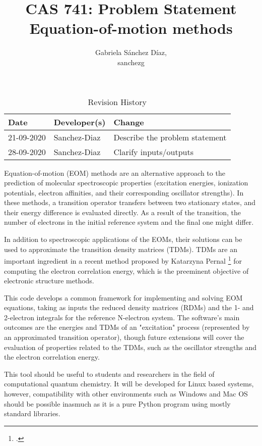\documentclass{article}
\title{CAS 741: Problem Statement\\Equation-of-motion methods}
\author{Gabriela S\'anchez D\'iaz,\\ sanchezg}
\date{}
\begin{document}
\maketitle

\begin{table}[hp]
\caption{Revision History} \label{TblRevisionHistory}
\begin{tabularx}{\textwidth}{llX}
\toprule
\textbf{Date} & \textbf{Developer(s)} & \textbf{Change}\\
\midrule
21-09-2020 & Sanchez-Diaz & Describe the problem statement\\
28-09-2020 & Sanchez-Diaz & Clarify inputs/outputs \\
\bottomrule
\end{tabularx}
\end{table}

Equation-of-motion (EOM) methods are an alternative approach to the prediction 
of molecular spectroscopic properties (excitation energies, ionization 
potentials, electron affinities, and their corresponding oscillator strengths). 
In these methods, a transition operator transfers between two stationary 
states, and their energy difference is evaluated directly. As a result of the 
transition, the number of electrons in the initial reference system and the 
final one might differ.

In addition to spectroscopic applications of the EOMs, their solutions can be 
used to approximate the transition density matrices (TDMs). TDMs are an 
important ingredient in a recent method proposed by Katarzyna 
Pernal \footcite{Pernal2018} for computing the electron correlation energy, 
which is the preeminent objective of electronic structure methods.  

This code develops a common framework for implementing and solving EOM 
equations, taking as inputs the reduced density matrices (RDMs) and the 1- and 
2-electron integrals for the reference N-electron system. The software's main 
outcomes are the energies and TDMs of an "excitation" process 
(represented by an approximated transition operator), though future extensions 
will cover the evaluation of properties related to the TDMs, such as the 
oscillator strengths and the electron correlation energy.


This tool should be useful to students and researchers in the field of 
computational quantum chemistry. It will be developed for Linux based systems, 
however, compatibility with other environments such as Windows and Mac OS 
should be possible inasmuch as it is a pure Python program using mostly 
standard libraries.
\end{document}
